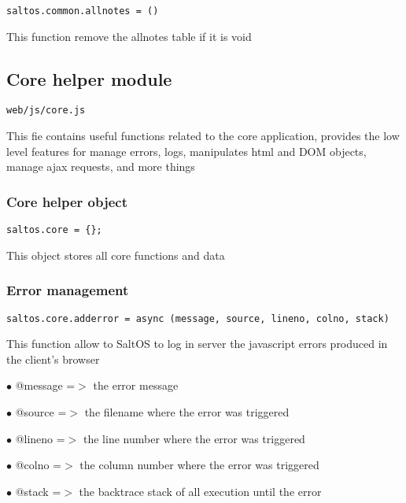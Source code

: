 \documentclass[a4paper]{article}
\begin{document}
\begin{lstlisting}
saltos.common.allnotes = ()
\end{lstlisting}

This function remove the allnotes table if it is void

\hypertarget{toc690}{}
\subsection{Core helper module}

\begin{lstlisting}
web/js/core.js
\end{lstlisting}

This fie contains useful functions related to the core application, provides the low level features
for manage errors, logs, manipulates html and DOM objects, manage ajax requests, and more things

\hypertarget{toc691}{}
\subsubsection{Core helper object}

\begin{lstlisting}
saltos.core = {};
\end{lstlisting}

This object stores all core functions and data

\hypertarget{toc692}{}
\subsubsection{Error management}

\begin{lstlisting}
saltos.core.adderror = async (message, source, lineno, colno, stack)
\end{lstlisting}

This function allow to SaltOS to log in server the javascript errors produced in the
client's browser

\begin{compactitem}
\item[\color{myblue}$\bullet$] @message =$>$ the error message
\item[\color{myblue}$\bullet$] @source  =$>$ the filename where the error was triggered
\item[\color{myblue}$\bullet$] @lineno  =$>$ the line number where the error was triggered
\item[\color{myblue}$\bullet$] @colno   =$>$ the column number where the error was triggered
\item[\color{myblue}$\bullet$] @stack   =$>$ the backtrace stack of all execution until the error
\end{compactitem}
\end{document}
